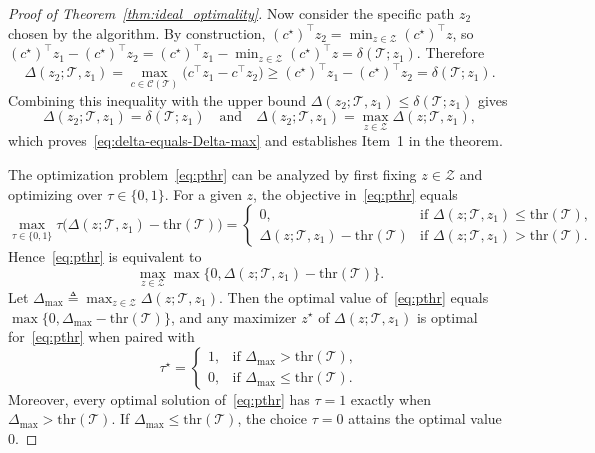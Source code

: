 \documentclass[11pt, letterpaper, oneside, reqno]{amsart}
\newcommand{\opt}{^\star}
\newcommand{\Let}{\triangleq}
\begin{document}
\begin{proof}[Proof of Theorem~\ref{thm:ideal_optimality}]
Now consider the specific path $z_2$ chosen by the algorithm. By construction, $(c\opt)^\top z_2 = \min_{z\in\mathcal Z} (c\opt)^\top z$, so
$(c\opt)^\top z_1 - (c\opt)^\top z_2
= (c\opt)^\top z_1 - \min_{z\in\mathcal Z} (c\opt)^\top z
= \delta(\mathcal T; z_1)$.
Therefore
\[
\Delta(z_2;\mathcal T,z_1)
= \max_{c\in\mathcal C(\mathcal T)} \bigl(c^\top z_1 - c^\top z_2\bigr)
\ge
(c\opt)^\top z_1 - (c\opt)^\top z_2
= \delta(\mathcal T; z_1).
\]
Combining this inequality with the upper bound $\Delta(z_2;\mathcal T,z_1)\le \delta(\mathcal T; z_1)$ gives
\[
\Delta(z_2;\mathcal T,z_1) = \delta(\mathcal T; z_1)
\quad\text{and}\quad
\Delta(z_2;\mathcal T,z_1) = \max_{z\in\mathcal Z} \Delta(z;\mathcal T,z_1),
\]
which proves~\eqref{eq:delta-equals-Delta-max} and establishes Item~1 in the theorem.

The optimization problem~\eqref{eq:pthr} can be analyzed by first fixing $z\in\mathcal Z$ and optimizing over $\tau\in\{0,1\}$. For a given $z$, the objective in~\eqref{eq:pthr} equals
\[
\max_{\tau\in\{0,1\}} \tau\bigl(\Delta(z;\mathcal T,z_1) - \mathrm{thr}(\mathcal T)\bigr)
=
\begin{cases}
0, & \text{if } \Delta(z;\mathcal T,z_1) \le \mathrm{thr}(\mathcal T),\\[0.5ex]
\Delta(z;\mathcal T,z_1) - \mathrm{thr}(\mathcal T) & \text{if } \Delta(z;\mathcal T,z_1) > \mathrm{thr}(\mathcal T).
\end{cases}
\]
Hence~\eqref{eq:pthr} is equivalent to
\[
\max_{z\in\mathcal Z}
\max\bigl\{0, \Delta(z;\mathcal T,z_1) - \mathrm{thr}(\mathcal T)\bigr\}.
\]
Let $\Delta_{\max} \Let \max_{z\in\mathcal Z} \Delta(z;\mathcal T,z_1)$. Then the optimal value of~\eqref{eq:pthr} equals $\max\{0,\Delta_{\max} - \mathrm{thr}(\mathcal T)\}$, and any maximizer $z\opt$ of $\Delta(z;\mathcal T,z_1)$ is optimal for~\eqref{eq:pthr} when paired with
\[
\tau\opt =
\begin{cases}
1, & \text{if } \Delta_{\max} > \mathrm{thr}(\mathcal T),\\
0, & \text{if } \Delta_{\max} \le \mathrm{thr}(\mathcal T).
\end{cases}
\]
Moreover, every optimal solution of~\eqref{eq:pthr} has $\tau=1$ exactly when $\Delta_{\max} > \mathrm{thr}(\mathcal T)$. If $\Delta_{\max}\le \mathrm{thr}(\mathcal T)$, the choice $\tau=0$ attains the optimal value $0$.


\end{proof}
\end{document}
